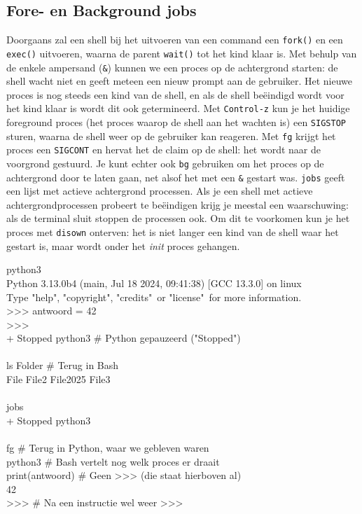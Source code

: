 \subsection{Fore- en Background jobs}\label{fore--en-background-jobs}

Doorgaans zal een shell bij het uitvoeren van een command een \texttt{fork()} en een \texttt{exec()} uitvoeren, waarna de parent \texttt{wait()} tot het kind klaar is. Met behulp van de enkele ampersand (\texttt{\&}) kunnen we een proces op de achtergrond starten: de shell wacht niet en geeft meteen een nieuw prompt aan de gebruiker. Het nieuwe proces is nog steeds een kind van de shell, en als de shell beëindigd wordt voor het kind klaar is wordt dit ook getermineerd. Met \texttt{Control-z} kun je het huidige foreground proces (het proces waarop de shell aan het wachten is) een \texttt{SIGSTOP} sturen, waarna de shell weer op de gebruiker kan reageren. Met \texttt{fg} krijgt het proces een \texttt{SIGCONT} en hervat het de claim op de shell: het wordt naar de voorgrond gestuurd. Je kunt echter ook \texttt{bg} gebruiken om het proces op de achtergrond door te laten gaan, net alsof het met een \texttt{\&} gestart was. \texttt{jobs} geeft een lijst met actieve achtergrond processen. Als je een shell met actieve achtergrondprocessen probeert te beëindigen krijg je meestal een waarschuwing: als de terminal sluit stoppen de processen ook. Om dit te voorkomen kun je het proces met \texttt{disown} onterven: het is niet langer een kind van de shell waar het gestart is, maar wordt onder het \emph{init} proces gehangen.

\begin{bash}
\userprompt[~] python3\\
Python 3.13.0b4 (main, Jul 18 2024, 09:41:38) [GCC 13.3.0] on linux \\
Type "help", "copyright", "credits"\  or "license"\ for more information.\\
>\!>\!> antwoord = 42\\
>\!>\!> \\
[1]+  Stopped                 python3                  \# Python gepauzeerd ("Stopped")\\
\\
\userprompt[~] ls Folder                                \# Terug in Bash\\
File File2 File2025 File3\\
\\
\userprompt[~] jobs\\
[1]+  Stopped                 python3\\
\\
\userprompt[~] fg                                       \# Terug in Python, waar we gebleven waren\\
python3                                                \# Bash vertelt nog welk proces er draait\\
print(antwoord)                                        \# Geen >\!>\!> (die staat hierboven al)\\
42\\
>\!>\!>                                                    \# Na een instructie wel weer >\!>\!>\\
\end{bash}

